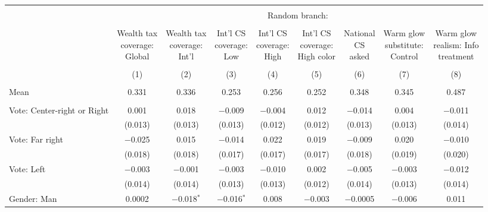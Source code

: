 
\begin{tabular}{@{\extracolsep{5pt}}lcccccccc} 
\\[-1.8ex]\hline 
\hline \\[-1.8ex] 
 & \multicolumn{8}{c}{Random branch:} \\ 
\cline{2-9} 
\\[-1.8ex] & \makecell{Wealth tax\\coverage:\\Global} & \makecell{Wealth tax\\coverage:\\Int'l} & \makecell{Int'l CS\\coverage:\\Low} & \makecell{Int'l CS\\coverage:\\High} & \makecell{Int'l CS\\coverage:\\High color} & \makecell{National\\CS\\asked} & \makecell{Warm glow\\substitute:\\Control} & \makecell{Warm glow\\realism: Info\\treatment} \\ 
\\[-1.8ex] & (1) & (2) & (3) & (4) & (5) & (6) & (7) & (8)\\ 
\hline \\[-1.8ex] 
Mean & 0.331 & 0.336 & 0.253 & 0.256 & 0.252 & 0.348 & 0.345 & 0.487  \\ \hline \\[-1.8ex]
 Vote: Center\mbox{-}right or Right & 0.001 & 0.018 & $-$0.009 & $-$0.004 & 0.012 & $-$0.014 & 0.004 & $-$0.011 \\ 
  & (0.013) & (0.013) & (0.013) & (0.012) & (0.012) & (0.013) & (0.013) & (0.014) \\ 
  Vote: Far right & $-$0.025 & 0.015 & $-$0.014 & 0.022 & 0.019 & $-$0.009 & 0.020 & $-$0.010 \\ 
  & (0.018) & (0.018) & (0.017) & (0.017) & (0.017) & (0.018) & (0.019) & (0.020) \\ 
  Vote: Left & $-$0.003 & $-$0.001 & $-$0.003 & $-$0.010 & 0.002 & $-$0.005 & $-$0.003 & $-$0.012 \\ 
  & (0.014) & (0.014) & (0.013) & (0.013) & (0.012) & (0.014) & (0.013) & (0.014) \\ 
  Gender: Man & 0.0002 & $-$0.018$^{*}$ & $-$0.016$^{*}$ & 0.008 & $-$0.003 & $-$0.0005 & $-$0.006 & 0.011 \\ 

\end{tabular}
